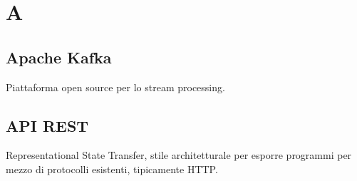 \section*{A}
\subsection*{Apache Kafka}
Piattaforma open source per lo stream processing.

\subsection*{API REST}
Representational State Transfer, stile architetturale per esporre programmi per mezzo di protocolli esistenti, tipicamente HTTP.

